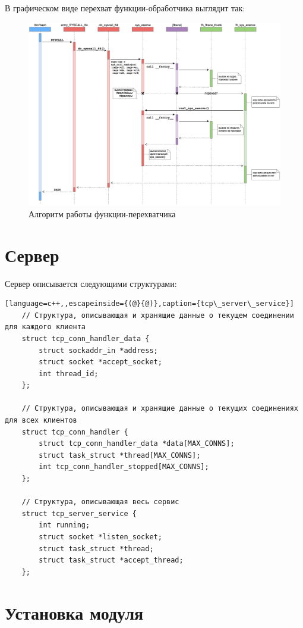 В графическом виде перехват функции-обработчика выглядит так:
\begin{figure}[h!]
	\centering
	\includegraphics[width=1.0\textwidth]{img/hook_work_scheme.png}
	\caption{Алгоритм работы функции-перехватчика}
	\label{fig:spire00}
\end{figure}

\newpage
\section{Сервер}

Сервер описывается следующими структурами:
\begin{lstlisting}[language=c++,,escapeinside={(@}{@)},caption={tcp\_server\_service}]
	// Структура, описывающая и хранящие данные о текущем соединении для каждого клиента
	struct tcp_conn_handler_data {
		struct sockaddr_in *address;
		struct socket *accept_socket;
		int thread_id;
	};
	
	// Структура, описывающая и хранящие данные о текущих соединениях для всех клиентов
	struct tcp_conn_handler {
		struct tcp_conn_handler_data *data[MAX_CONNS];
		struct task_struct *thread[MAX_CONNS];
		int tcp_conn_handler_stopped[MAX_CONNS];
	};
	
	// Структура, описывающая весь сервис
	struct tcp_server_service {
		int running;
		struct socket *listen_socket;
		struct task_struct *thread;	
		struct task_struct *accept_thread;
	};
\end{lstlisting}

\section{Установка модуля}

